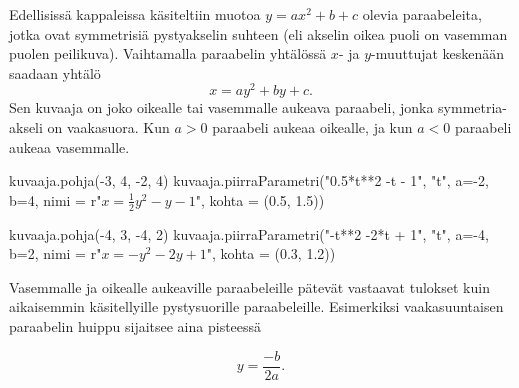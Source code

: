 


Edellisissä kappaleissa käsiteltiin muotoa $y = ax^2 + b + c$ olevia paraabeleita, jotka ovat symmetrisiä pystyakselin suhteen (eli akselin oikea puoli on vasemman puolen peilikuva). Vaihtamalla paraabelin yhtälössä $x$- ja $y$-muuttujat keskenään saadaan yhtälö
\[x=ay^2+by+c.\]
Sen kuvaaja on joko oikealle tai vasemmalle aukeava paraabeli, jonka symmetria-akseli on vaakasuora. Kun $a>0$ paraabeli aukeaa oikealle, ja kun $a < 0$ paraabeli aukeaa vasemmalle.


\begin{kuva}
    kuvaaja.pohja(-3, 4, -2, 4)
    kuvaaja.piirraParametri("0.5*t**2 -t - 1", "t", a=-2, b=4, nimi = r"$x = \frac{1}{2}y^2  - y -1$", kohta = (0.5, 1.5))
\end{kuva}


\begin{kuva}
    kuvaaja.pohja(-4, 3, -4, 2)
    kuvaaja.piirraParametri("-t**2 -2*t + 1", "t", a=-4, b=2, nimi = r"$x = -y^2 - 2y +1$", kohta = (0.3, 1.2))
\end{kuva}



Vasemmalle ja oikealle aukeaville paraabeleille pätevät vastaavat tulokset kuin aikaisemmin käsitellyille pystysuorille paraabeleille. Esimerkiksi vaakasuuntaisen paraabelin huippu sijaitsee aina pisteessä

\[y = \frac{-b}{2a}.\]


